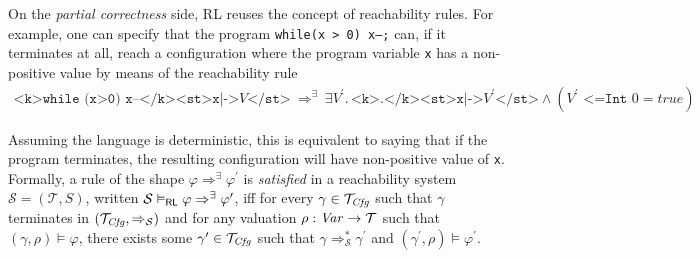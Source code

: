 On the \emph{partial correctness} side, RL reuses the concept of reachability rules.
For example, one can specify that the program \texttt{while(x > 0) x--;}
can, if it terminates at all, reach a configuration
where the program variable \texttt{x} has a non-positive value
by means of the reachability rule
\begin{equation*}
    \begin{aligned}
        \texttt{<k>while (x>0) x--</k><st>x|->} V \texttt{</st>}
        \ \Rightarrow^\exists\  \exists V^\prime.\, \texttt{<k>.</k><st>x|->}
        V^\prime \texttt{</st>} \land (V^\prime \texttt{ <=Int } 0 = \mathit{true})
    \end{aligned}
  \end{equation*}
  
Assuming the language is deterministic, this is equivalent to saying that if the program terminates,
the resulting configuration will have non-positive value of \texttt{x}.
Formally, a rule of the shape $\varphi \Rightarrow^\exists \varphi^\prime$
is \emph{satisfied}
in a reachability system $\mathcal{S} = (\mathcal{T}, S)$,
written $\mathcal{S} \vDash_{\mathsf{RL}} \varphi \Rightarrow^\exists \varphi^\prime$,
iff for every $\gamma \in \mathcal{T}_{\mathit{Cfg}}$
such that $\gamma$ terminates in $(\mathcal{T}_{\mathit{Cfg}}, \Rightarrow_{\mathcal{S}})$
and for any valuation $\rho : \mathit{Var} \to \mathcal{T}$
such that $(\gamma, \rho) \vDash \varphi$,
there exists some $\gamma^\prime \in \mathcal{T}_{\mathit{Cfg}}$
such that
$\gamma \Rightarrow^{*}_{\mathcal{S}} \gamma^\prime$
and $(\gamma^\prime, \rho) \vDash \varphi^\prime$.


